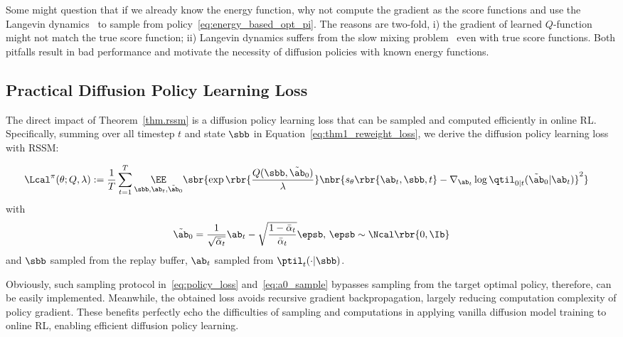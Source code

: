 \begin{remark}\label{remark:langevin}
    Some might question that if we already know the energy function, why not compute the gradient as the score functions and use the Langevin dynamics~\cite{parisi1981correlation} to sample from policy~\eqref{eq:energy_based_opt_pi}.  The reasons are two-fold, i) the gradient of learned $Q$-function might not match the true score function; ii) Langevin dynamics suffers from the slow mixing problem~\citep[shown in ]{song2019generative} even with true score functions. Both pitfalls result in bad performance and motivate the necessity of diffusion policies with known energy functions.
\end{remark}

\subsection{Practical Diffusion Policy Learning Loss}
The direct impact of Theorem~\ref{thm.rssm} is a diffusion policy learning loss that can be sampled and computed efficiently in online RL. Specifically, summing over all timestep $t$ and state $\sbb$ in Equation~\eqref{eq:thm1_reweight_loss}, we derive the diffusion policy learning loss with RSSM:

{
\small
\begin{equation}
    \begin{aligned}
        &\Lcal^\pi(\theta;Q,\lambda) := \frac{1}{T}\sum_{t=1}^T\underset{{\sbb, \ab_t,\tilde\ab_0}}{\EE}\sbr{\exp\rbr{\frac{Q(\sbb,\tilde\ab_0)}{\lambda}}\nbr{s_\theta\rbr{\ab_t, \sbb, t} - \nabla_{\ab_t}\log\qtil_{0|t}(\tilde\ab_0|\ab_t)}^2}
    \end{aligned}\label{eq:policy_loss}
\end{equation}
}
with 
\begin{equation}
    \tilde\ab_0 = \frac{1}{\sqrt{\bar\alpha_t}}\ab_t - \sqrt{\frac{1 - \bar\alpha_t}{\bar\alpha_t}} \epsb,\, \epsb\sim\Ncal\rbr{0, \Ib}\label{eq:a0_sample}
\end{equation}
and $\sbb$ sampled from the replay buffer, $\ab_t$ sampled from $\ptil_t(\cdot|\sbb)$. 

Obviously, such sampling protocol in~\eqref{eq:policy_loss} and~\eqref{eq:a0_sample} bypasses sampling from the target optimal policy, therefore, can be easily implemented. Meanwhile, the obtained loss avoids recursive gradient backpropagation, largely reducing computation complexity of policy gradient. These benefits perfectly echo the difficulties of sampling and computations in applying vanilla diffusion model training to online RL, enabling efficient diffusion policy learning. 






